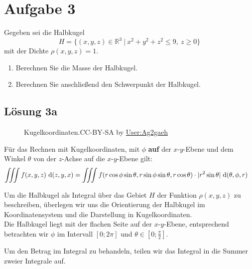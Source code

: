 \documentclass[main.tex]{subfiles}
\begin{document}
\section{Aufgabe 3}
Gegeben sei die Halbkugel
\[
    H = \{ (x,y,z) \in \mathbb{R}^3 \ | \ x^2 + y^2 + z^2 \leq 9, \ z \geq 0 \}
\]
mit der Dichte $\rho(x, y, z) = 1$.
\begin{enumerate}
    \item Berechnen Sie die Masse der Halbkugel.
    \item Berechnen Sie anschließend den Schwerpunkt der Halbkugel.
\end{enumerate}

\subsection{Lösung 3a}
\begin{figure}
    \begin{center}
        
        \caption{Kugelkoordinaten.CC-BY-SA by \href{https://commons.wikimedia.org/wiki/User:Ag2gaeh}{User:Ag2gaeh}}
    \end{center}
\end{figure}

Für das Rechnen mit Kugelkoordinaten, mit $\phi$ \textbf{auf} der $x$-$y$-Ebene und
dem Winkel $\theta$ von der $z$-Achse auf die $x$-$y$-Ebene gilt:
\begin{align*}
    \iiint f(x,y,z) ~\mathrm{d}(z,y,x) &=
        \iiint f(r\cos\phi\sin\theta, r\sin\phi\sin\theta, r\cos\theta )\cdot |r^2\sin\theta| ~\mathrm{d}(\theta, \phi, r)
\end{align*}

Um die Halbkugel als Integral über das Gebiet $H$ der Funktion $\rho(x, y, z)$ zu beschreiben, überlegen wir uns die Orientierung der Halbkugel im Koordinatensystem und die Darstellung in Kugelkoordinaten.\\

Die Halbkugel liegt mit der flachen Seite auf der $x$-$y$-Ebene, entsprechend betrachten wir $\phi$ im Intervall $[0;2\pi]$ und $\theta \in [0; \frac{\pi}{2}]$.

Um den Betrag im Integral zu behandeln, teilen wir das Integral in die Summer zweier Integrale auf.
\end{document}
